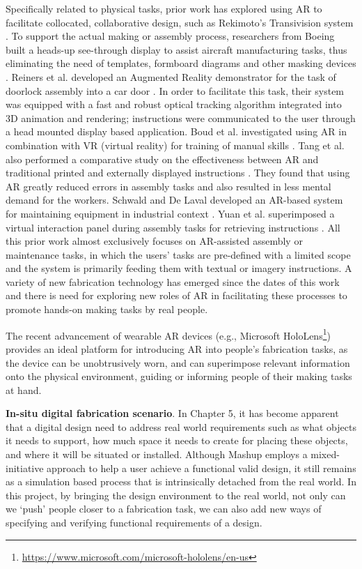 Specifically related to physical tasks, prior work has explored using AR to facilitate collocated, collaborative design, such as Rekimoto's Transivision system \cite{rekimoto1996transvision}. To support the actual making or assembly process, researchers from Boeing built a heads-up see-through display to assist aircraft manufacturing tasks, thus eliminating the need of templates, formboard diagrams and other masking devices \cite{caudell1992augmented}. Reiners et al. developed an Augmented Reality demonstrator for the task of doorlock assembly into a car door \cite{reiners1998augmented}. In order to facilitate this task, their system was equipped with a fast and robust optical tracking algorithm integrated into 3D animation and rendering; instructions were communicated to the user through a head mounted display based application. Boud et al. investigated using AR in combination with VR (virtual reality) for training of manual skills \cite{boud1999virtual}. Tang et al. also performed a comparative study on the effectiveness between AR and traditional printed and externally displayed instructions \cite{tang2003comparative}. They found that using AR greatly reduced errors in assembly tasks and also resulted in less mental demand for the workers. Schwald and De Laval developed an AR-based system for maintaining equipment in industrial context \cite{schwald2003augmented}. Yuan et al. superimposed a virtual interaction panel during assembly tasks for retrieving instructions \cite{yuan2005assembly}. All this prior work almost exclusively focuses on AR-assisted assembly or maintenance tasks, in which the users' tasks are pre-defined with a limited scope and the system is primarily feeding them with textual or imagery instructions. A variety of new fabrication technology has emerged since the dates of this work and there is need for exploring new roles of AR in facilitating these processes to promote hands-on making tasks by real people.

 The recent advancement of wearable AR devices (e.g., Microsoft HoloLens\footnote{\url{https://www.microsoft.com/microsoft-hololens/en-us}}) provides an ideal platform for introducing AR into people's fabrication tasks, as the device can be unobtrusively worn, and can superimpose relevant information onto the physical environment, guiding or informing people of their making tasks at hand.

\textbf{In-situ digital fabrication scenario}. In Chapter 5, it has become apparent that a digital design need to address real world requirements such as what objects it needs to support, how much space it needs to create for placing these objects, and where it will be situated or installed. Although Mashup employs a mixed-initiative approach to help a user achieve a functional valid design, it still remains as a simulation based process that is intrinsically detached from the real world. In this project, by bringing the design environment to the real world, not only can we `push' people closer to a fabrication task, we can also add new ways of specifying and verifying functional requirements of a design.

